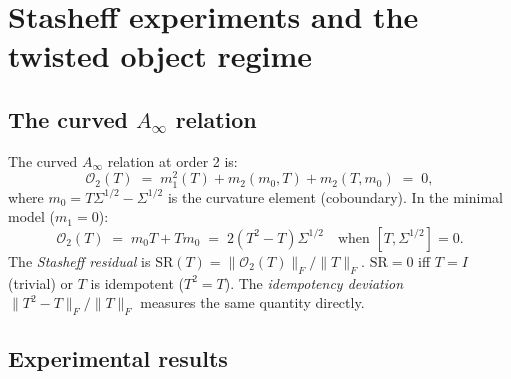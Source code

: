\documentclass[11pt]{amsart}
\theoremstyle{definition}
\begin{document}
\section{Stasheff experiments and the twisted object regime}
\label{sec:stasheff}

\subsection{The curved $A_\infty$ relation}

The curved $A_\infty$ relation at order 2 is:
\[
  \mathcal{O}_2(T) \;=\; m_1^2(T) + m_2(m_0, T) + m_2(T, m_0) \;=\; 0,
\]
where $m_0 = T\Sigma^{1/2} - \Sigma^{1/2}$ is the curvature element (coboundary).
In the minimal model ($m_1=0$):
\[
  \mathcal{O}_2(T) \;=\; m_0 T + T m_0 \;=\; 2(T^2 - T)\Sigma^{1/2}
  \quad\text{when }[T, \Sigma^{1/2}]=0.
\]
The \emph{Stasheff residual} is $\mathrm{SR}(T) = \|\mathcal{O}_2(T)\|_F / \|T\|_F$.
$\mathrm{SR} = 0$ iff $T = I$ (trivial) or $T$ is idempotent ($T^2 = T$).
The \emph{idempotency deviation} $\|T^2-T\|_F/\|T\|_F$ measures the same quantity directly.

\subsection{Experimental results}
\end{document}

